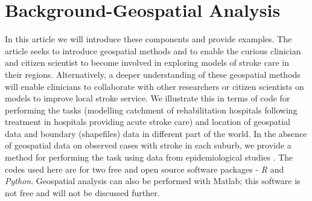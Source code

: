 \documentclass[utf8]{frontiersHLTH}
\begin{document}

\section{Background-Geospatial Analysis}\label{background} 

In this article we will introduce these components and provide
examples. The article seeks to introduce geospatial methods and to
enable the curious clinician and citizen scientist to become involved
in exploring models of stroke care in their regions. Alternatively, a
deeper understanding of these geospatial methods will enable
clinicians to collaborate with other researchers or citizen scientists
on models to improve local stroke service. We illustrate this in terms
of code for performing the tasks (modelling catchment of
rehabilitation hospitals following treatment in hospitals providing
acute stroke care) and location of geospatial data and boundary
(shapefiles) data in different part of the world. In the absence of
geospatial data on observed cases with stroke in each suburb, we
provide a method for performing the task using data from
epidemiological studies \cite{Phan_2017}. The codes used here are for
two free and open source software packages - {\em R} and {\em
  Python}. Geospatial analysis can also be performed with
Matlab\cite{Milne_2017}; this software is not free and will not be
discussed further.
\end{document}
